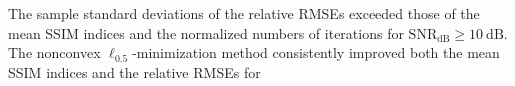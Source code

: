The sample standard deviations of
the relative \acp{RMSE} exceeded
those of
the mean \ac{SSIM} indices and
the normalized numbers of
iterations for
$\text{SNR}_{\text{dB}} \geq \SI{10}{\deci\bel}$.
The nonconvex $\ell_{0.5}$-minimization method
 consistently improved both
the mean \ac{SSIM} indices and
the relative \acp{RMSE} for

